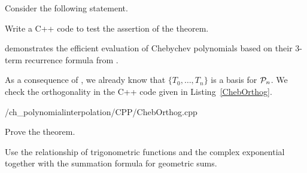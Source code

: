 \begin{problem}
Consider the following statement.


\begin{subproblem}[2] 
Write a C++ code to test the assertion of the theorem.

\begin{hint}
   demonstrates the efficient evaluation of Chebychev
  polynomials based on their 3-term recurrence formula from .
\end{hint}

   \begin{solution}
As a consequence of , we already know that $\{T_0,\dots,T_n\}$
is a basis for ${\cal P}_{n}$. We check the orthogonality in the C++ code given in
Listing~\ref{ChebOrthog}.

 {\problems/ch_polynomialinterpolation/CPP/ChebOrthog.cpp}
\end{solution}
\end{subproblem}

\begin{subproblem}[4] 
Prove the theorem.

\begin{hint}
  Use the relationship of trigonometric functions and the complex exponential
  together with the summation formula for geometric sums. 
\end{hint}


\end{subproblem}
\end{problem}
